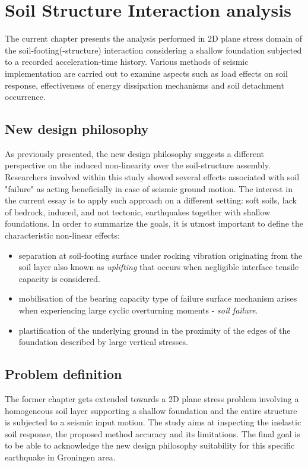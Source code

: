 \documentclass[10pt,a4paper]{report}
\begin{document}
	
	\chapter{Soil Structure Interaction analysis} \label{ch6}
	
	The current chapter presents the analysis performed in 2D plane stress domain of the soil-footing(-structure) interaction considering a shallow foundation subjected to a recorded acceleration-time history. Various methods of seismic implementation are carried out to examine aspects such as load effects on soil response, effectiveness of energy dissipation mechanisms and soil detachment occurrence.
	
	\section{New design philosophy}
	As previously presented, the new design philosophy suggests a different perspective on the induced non-linearity over the soil-structure assembly. Researchers involved within this study showed \mbox{several} effects associated with soil "failure" as acting beneficially in case of seismic ground motion. The interest in the current essay is to apply such approach on a different setting: soft soils, lack of bedrock, induced, and not tectonic, earthquakes together with shallow foundations. In order to summarize the goals, it is utmost important to define the characteristic non-linear effects:
	\begin{itemize}
		\item separation at soil-footing surface under rocking vibration originating from the soil layer also known as \textit{uplifting} that occurs when negligible interface tensile capacity is considered.
		\item mobilisation of the bearing capacity type of failure surface mechanism arises when experiencing large cyclic overturning moments - \textit{soil failure}.
		\item plastification of the underlying ground in the proximity of the edges of the foundation \mbox{described} by large vertical stresses.
	\end{itemize} 
	
	\section{Problem definition}
	The former chapter gets extended towards a 2D plane stress problem involving a homogeneous soil layer supporting a shallow foundation and the entire structure is subjected to a seismic input motion. The study aims at inspecting the inelastic soil response, the proposed method accuracy and its limitations. The final goal is to be able to acknowledge the new design philosophy suitability for this specific earthquake in Groningen area.
	
\end{document}
